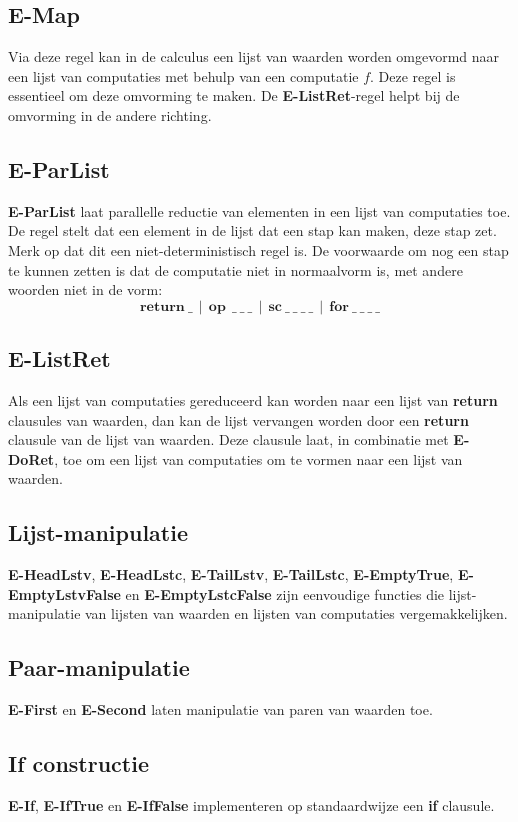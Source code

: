 \subsection{E-Map}
Via deze regel kan in de calculus een lijst van waarden worden omgevormd naar een lijst van computaties met behulp van een computatie $f$. Deze regel is essentieel om deze omvorming te maken. De \textbf{E-ListRet}-regel helpt bij de omvorming in de andere richting. 
\subsection{E-ParList}
\textbf{E-ParList} laat parallelle reductie van elementen in een lijst van computaties toe. De regel stelt dat een element in de lijst dat een stap kan maken, deze stap zet. Merk op dat dit een niet-deterministisch regel is. De voorwaarde om nog een stap te kunnen zetten is dat de computatie niet in normaalvorm is, met andere woorden niet in de vorm:
\begin{equation}
    \textbf{return}\:\_ \:\:|\:\:\textbf{op}\:\:\_\:\_\:\_\:\:|\:\:\textbf{sc}\:\_\:\_\:\_\:\_\:\:|\:\:\textbf{for}\:\_\:\_\:\_\:\_
\end{equation}

\subsection{E-ListRet}
Als een lijst van computaties gereduceerd kan worden naar een lijst van \textbf{return} clausules van waarden, dan kan de lijst vervangen worden door een \textbf{return} clausule van de lijst van waarden. Deze clausule laat, in combinatie met \textbf{E-DoRet}, toe om een lijst van computaties om te vormen naar een lijst van waarden.

\subsection{Lijst-manipulatie}
\textbf{E-HeadLstv}, \textbf{E-HeadLstc}, \textbf{E-TailLstv}, \textbf{E-TailLstc}, \textbf{E-EmptyTrue}, \textbf{E-EmptyLstvFalse} en \textbf{E-EmptyLstcFalse} zijn eenvoudige functies die lijst-manipulatie van lijsten van waarden en lijsten van computaties vergemakkelijken.

\subsection{Paar-manipulatie}
\textbf{E-First} en \textbf{E-Second} laten manipulatie van paren van waarden toe.

\subsection{If constructie}
\textbf{E-If}, \textbf{E-IfTrue} en \textbf{E-IfFalse} implementeren op standaardwijze een \textbf{if} clausule.


